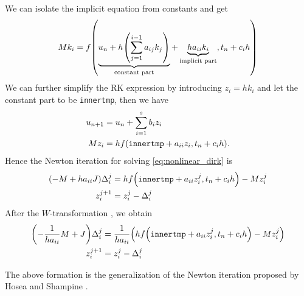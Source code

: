 \documentclass[a4paper,9pt]{article}
\theoremstyle{definition}
\theoremstyle{remark}
\begin{document}
We can isolate the implicit equation from constants and get
\begin{equation}
  M k_i = f\qty(\underbrace{u_n + h\qty(\sum_{j=1}^{i-1} a_{ij} k_j
  )}_\text{constant part} + \underbrace{h a_{ii} k_i}_\text{implicit part},
  t_{n}+c_{i}h)
\end{equation}
We can further simplify the RK expression by introducing $z_i=hk_i$ and let the
constant part to be \texttt{innertmp}, then we
have
\begin{align}
  u_{n+1} &= u_n + \sum_{i=1}^s b_i z_i \\
  M z_i &= h f\qty(\texttt{innertmp} + a_{ii} z_i, t_{n}+c_{i}h)
  \label{eq:nonlinear_dirk}.
\end{align}
Hence the Newton iteration for solving \cref{eq:nonlinear_dirk} is
\begin{align}
  \qty(-M + h a_{ii}J) \Delta^j_i &= h f\qty(\texttt{innertmp} + a_{ii} z^j_i,
  t_{n}+c_{i}h) - M z^j_i \\
  z^{j+1}_i &= z^j_i - \Delta^j_i
\end{align}
After the $W$-transformation \cite{hairer2010solving}, we obtain
\begin{align} \label{eq:newton_dirk}
  \qty(-\frac{1}{h a_{ii}}M + J) \Delta^j_i &= \frac{1}{h a_{ii}} \qty(h
  f\qty(\texttt{innertmp} + a_{ii} z^j_i, t_{n}+c_{i}h) - M z^j_i) \\
  z^{j+1}_i &= z^j_i - \Delta^j_i
\end{align}

The above formation is the generalization of the Newton iteration proposed by
Hosea and Shampine \cite{hosea1996analysis}.
\end{document}
